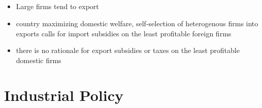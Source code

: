 \documentclass[10pt]{article} %
\begin{document}
    \subsection{\cite{CostinotRodriguezClareIvan2020}}
    \begin{itemize}
        \item Large firms tend to export
        \item country maximizing domestic welfare, self-selection of heterogenous firms into exports calls for import subsidies on the least profitable foreign firms
        \item there is no rationale for export subsidies or taxes on the least profitable domestic firms
    \end{itemize}

    \subsection{\cite{AtkesonBurstein2008}}

\section{Industrial Policy}
    \subsection{\cite{JuhaszLaneRodrik2023}}
\end{document}
